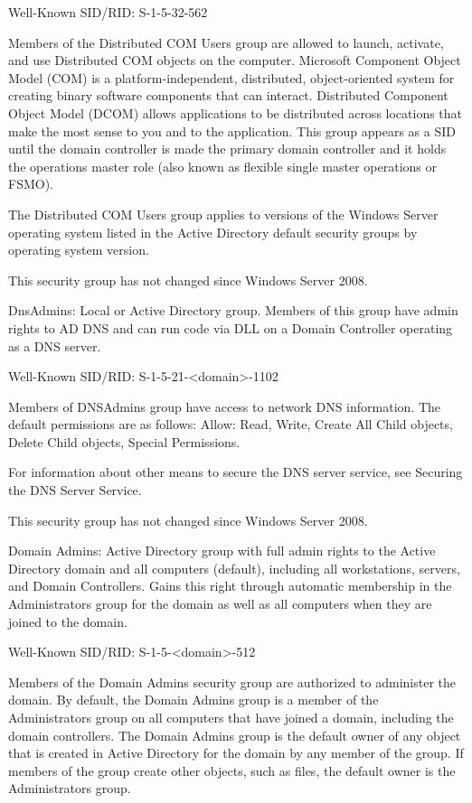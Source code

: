 Well-Known SID/RID: S-1-5-32-562

Members of the Distributed COM Users group are allowed to launch, activate, and use Distributed COM objects on the computer. Microsoft Component Object Model (COM) is a platform-independent, distributed, object-oriented system for creating binary software components that can interact. Distributed Component Object Model (DCOM) allows applications to be distributed across locations that make the most sense to you and to the application. This group appears as a SID until the domain controller is made the primary domain controller and it holds the operations master role (also known as flexible single master operations or FSMO).

The Distributed COM Users group applies to versions of the Windows Server operating system listed in the Active Directory default security groups by operating system version.

This security group has not changed since Windows Server 2008.

DnsAdmins: Local or Active Directory group. Members of this group have admin rights to AD DNS and can run code via DLL on a Domain Controller operating as a DNS server.

Well-Known SID/RID: S-1-5-21-<domain>-1102

Members of DNSAdmins group have access to network DNS information. The default permissions are as follows: Allow: Read, Write, Create All Child objects, Delete Child objects, Special Permissions.

For information about other means to secure the DNS server service, see Securing the DNS Server Service.

This security group has not changed since Windows Server 2008.

Domain Admins: Active Directory group with full admin rights to the Active Directory domain and all computers (default), including all workstations, servers, and Domain Controllers. Gains this right through automatic membership in the Administrators group for the domain as well as all computers when they are joined to the domain.

Well-Known SID/RID: S-1-5-<domain>-512

Members of the Domain Admins security group are authorized to administer the domain. By default, the Domain Admins group is a member of the Administrators group on all computers that have joined a domain, including the domain controllers. The Domain Admins group is the default owner of any object that is created in Active Directory for the domain by any member of the group. If members of the group create other objects, such as files, the default owner is the Administrators group.

